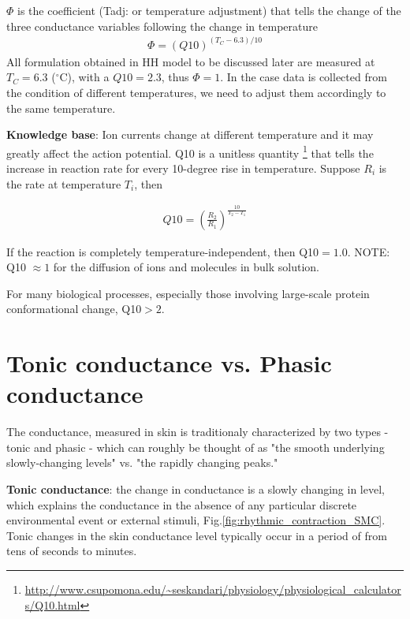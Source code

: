 
$\Phi$ is the coefficient (Tadj: or temperature adjustment)
that tells the change of the three conductance variables following the
change in temperature
\begin{eqnarray*}
  \Phi=(Q10)^{(T_C-6.3)/10}
\end{eqnarray*}
All formulation obtained in HH model to be discussed later are measured at
$T_C=6.3$ ($^\circ$C), with a $Q10=2.3$, thus $\Phi=1$. In the case data is
collected from the condition of different temperatures, we need to adjust them
accordingly to the same temperature.

\begin{mdframed}

  {\bf Knowledge base}: Ion currents change at different temperature and it may
  greatly affect the action potential. Q10 is a unitless
  quantity
  \footnote{\url{http://www.csupomona.edu/~seskandari/physiology/physiological_calculators/Q10.html}}
  that tells the increase in reaction rate for every 10-degree rise in
  temperature. Suppose $R_i$ is the rate at temperature $T_i$, then

  \begin{eqnarray*}
    Q10 = \left( \frac{R_2}{R_1} \right)^{\frac{10}{T_2-T_1}}
  \end{eqnarray*}

  If the reaction is completely temperature-independent, then
  Q10$=1.0$. NOTE: Q10 $\approx 1$ for the diffusion of ions and
  molecules in bulk solution.

  For many biological processes, especially those involving large-scale protein
  conformational change, Q10$ > 2$.

\end{mdframed}

\section{Tonic conductance vs. Phasic conductance}
\label{sec:tonic-conductance}
\label{sec:phasic-conductance}

The conductance, measured in skin is traditionaly characterized by
 two types - tonic and phasic - which can roughly be thought of as "the smooth
underlying slowly-changing levels" vs. "the rapidly changing peaks."

{\bf Tonic conductance}: the change in conductance is a slowly changing in
level, which explains the conductance in the absence of any particular discrete
environmental event or external stimuli, Fig.\ref{fig:rhythmic_contraction_SMC}.
Tonic changes in the skin conductance level typically occur in a period of from
tens of seconds to minutes.

